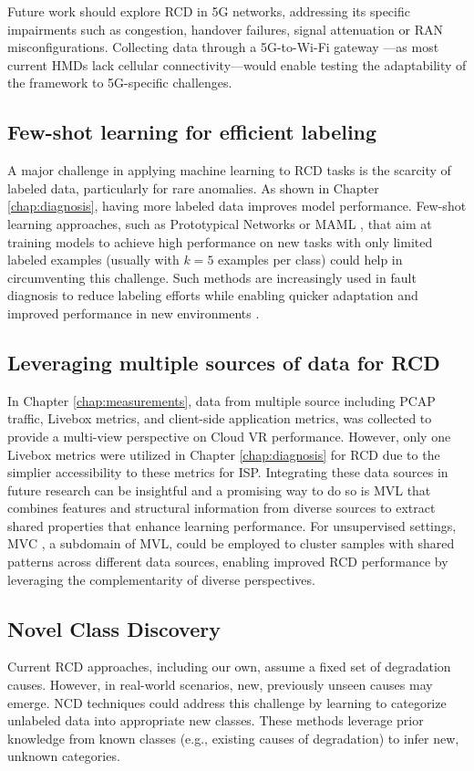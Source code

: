 Future work should explore RCD in 5G networks, addressing its specific impairments such as congestion, handover failures, signal attenuation or RAN misconfigurations. Collecting data through a 5G-to-Wi-Fi gateway \cite{penaherrera2024cloud}—as most current \ac{HMDs} lack cellular connectivity—would enable testing the adaptability of the framework to 5G-specific challenges.

\subsection*{Few-shot learning for efficient labeling}
A major challenge in applying machine learning to RCD tasks is the scarcity of labeled data, particularly for rare anomalies. As shown in Chapter \ref{chap:diagnosis}, having more labeled data improves model performance. Few-shot learning approaches, such as Prototypical Networks \cite{snell2017prototypical} or \ac{MAML} \cite{finn2017model}, that aim at training models to achieve high performance on new tasks with only limited labeled examples (usually with $k=5$ examples per class) could help in circumventing this challenge. Such methods are increasingly used in fault diagnosis to reduce labeling efforts while enabling quicker adaptation and improved performance in new environments \cite{wang2022few, yang2023generalized}.

\subsection*{Leveraging multiple sources of data for RCD}
In Chapter \ref{chap:measurements}, data from multiple source including \ac{PCAP} traffic, Livebox metrics, and client-side application metrics, was collected to provide a multi-view perspective on Cloud VR performance. However, only one Livebox metrics were utilized in Chapter \ref{chap:diagnosis} for RCD due to the simplier accessibility to these metrics for \ac{ISP}. Integrating these data sources in future research can be insightful and a promising way to do so is \ac{MVL} \cite{xu2013survey, li2018survey} that combines features and structural information from diverse sources to extract shared properties that enhance learning performance. For unsupervised settings, \ac{MVC} \cite{chao2017survey, zhou2024survey}, a subdomain of MVL, could be employed to cluster samples with shared patterns across different data sources, enabling improved RCD performance by leveraging the complementarity of diverse perspectives.

\subsection*{Novel Class Discovery}
Current RCD approaches, including our own, assume a fixed set of degradation causes. However, in real-world scenarios, new, previously unseen causes may emerge. \ac{NCD} techniques \cite{troisemaine2023novel} could address this challenge by learning to categorize unlabeled data into appropriate new classes. These methods leverage prior knowledge from known classes (e.g., existing causes of degradation) to infer new, unknown categories.

